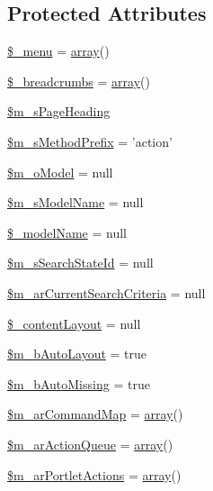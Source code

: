 \subsection*{Protected Attributes}
\begin{DoxyCompactItemize}
\item 
\hyperlink{classCPSController_a4192f529627c76fa7a70ae23b9582516}{\$\_\-menu} = \hyperlink{list_8php_aa3205d038c7f8feb5c9f01ac4dfadc88}{array}()
\item 
\hyperlink{classCPSController_aa29f8061f06b0d1991b405eb2b5817fd}{\$\_\-breadcrumbs} = \hyperlink{list_8php_aa3205d038c7f8feb5c9f01ac4dfadc88}{array}()
\item 
\hyperlink{classCPSController_a13d322a909191c149073cc615301d6c2}{\$m\_\-sPageHeading}
\item 
\hyperlink{classCPSController_a00395af87aa1ea39a227b3ff7f822455}{\$m\_\-sMethodPrefix} = 'action'
\item 
\hyperlink{classCPSController_ac050ea66692a19671c369961a81fb7f7}{\$m\_\-oModel} = null
\item 
\hyperlink{classCPSController_ac69f9415b98d14c89043029a9c2cb0cc}{\$m\_\-sModelName} = null
\item 
\hyperlink{classCPSController_a3caade7aa0b96407057e060e4a8bba1e}{\$\_\-modelName} = null
\item 
\hyperlink{classCPSController_abf7a80aa37d98c6879fdeac9b9ed0dfd}{\$m\_\-sSearchStateId} = null
\item 
\hyperlink{classCPSController_ad84b172fc8b07205968983aa7ead7f56}{\$m\_\-arCurrentSearchCriteria} = null
\item 
\hyperlink{classCPSController_a563111c63fb9315722e30c4798e1edf7}{\$\_\-contentLayout} = null
\item 
\hyperlink{classCPSController_a82f270690d35ca2d667930309b40e52e}{\$m\_\-bAutoLayout} = true
\item 
\hyperlink{classCPSController_a348549b714d32b0cd44fe0e63100ed8a}{\$m\_\-bAutoMissing} = true
\item 
\hyperlink{classCPSController_a8a9ecdbe8dd0813218e90b2e4642900b}{\$m\_\-arCommandMap} = \hyperlink{list_8php_aa3205d038c7f8feb5c9f01ac4dfadc88}{array}()
\item 
\hyperlink{classCPSController_a38c24de57d837a560704c7d6aa27526b}{\$m\_\-arActionQueue} = \hyperlink{list_8php_aa3205d038c7f8feb5c9f01ac4dfadc88}{array}()
\item 
\hyperlink{classCPSController_a3c4633512ae87d3b845b59d4514115d5}{\$m\_\-arPortletActions} = \hyperlink{list_8php_aa3205d038c7f8feb5c9f01ac4dfadc88}{array}()

\end{DoxyCompactItemize}
